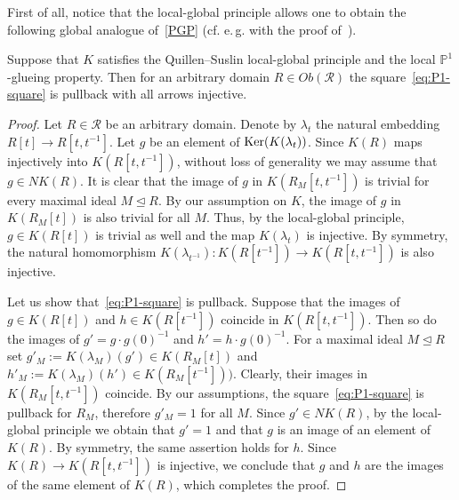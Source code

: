 \documentclass[oneside, 11pt]{amsart} \pdfoutput=1
\begin{document}
First of all, notice that the local-global principle allows one to obtain the following global analogue of~\ref{PGP} (cf. e.\,g. with the proof of~\cite[Theorem~1]{LS20}).
\begin{lemma} \label{ght}
Suppose that $K$ satisfies the Quillen--Suslin local-global principle and the local $\mathbb{P}^1$-glueing property. Then for an arbitrary domain $R \in Ob(\mathcal{R})$ the square~\eqref{eq:P1-square} is pullback with all arrows injective. \end{lemma}
\begin{proof}
Let $R \in \mathcal{R}$ be an arbitrary domain. Denote by $\lambda_t$ the natural embedding $R[t] \to R[t, t^{-1}]$. Let $g$ be an element of $\mathop{\mathrm{Ker}}\nolimits(K(\lambda_t))$. Since $K(R)$ maps injectively into $K(R[t, t^{-1}])$, without loss of generality we may assume that $g \in NK(R)$.
It is clear that the image of $g$ in $K(R_M[t, t^{-1}])$ is trivial for every maximal ideal $M \trianglelefteq R$. By our assumption on $K$, the image of $g$ in $K(R_M[t])$ is also trivial for all $M$. Thus, by the local-global principle, $g \in K(R[t])$ is trivial as well and the map $K(\lambda_t)$ is injective. By symmetry, the natural homomorphism $K(\lambda_{t^{-1}})\colon K(R[t^{-1}]) \to K(R[t, t^{-1}])$ is also injective. 

Let us show that~\eqref{eq:P1-square} is pullback. Suppose that the images of $g \in K(R[t])$ and $h \in K(R[t^{-1}])$ coincide in $K(R[t, t^{-1}])$. Then so do the images of $g' = g \cdot g(0)^{-1}$ and $h' = h \cdot g(0)^{-1}$. For a maximal ideal $M\trianglelefteq R$ set $g'_M := K(\lambda_M)(g') \in K(R_M[t])$ and $h'_M := K(\lambda_M)(h') \in K(R_M[t^{-1}]))$. Clearly, their images in $K(R_M[t, t^{-1}])$ coincide. By our assumptions, the square~\eqref{eq:P1-square} is pullback for $R_M$, therefore $g'_M = 1$ for all $M$. Since $g' \in NK(R)$, by the local-global principle we obtain that $g' = 1$ and that $g$ is an image of an element of $K(R)$. By symmetry, the same assertion holds for $h$. Since $K(R)\to K(R[t, t^{-1}])$ is injective, we conclude that $g$ and $h$ are the images of the same element of $K(R)$, which completes the proof.  \end{proof}
\end{document}
